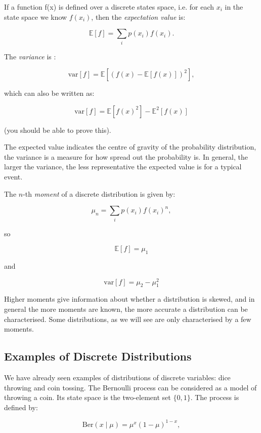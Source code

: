 If a function f(x) is defined over a discrete states space, i.e. for each $x_i$ in the state space
we know $f(x_i)$, then the \emph{expectation value} is:

\begin{equation}
\mathbb{E}[f] = \sum_i p(x_i)f(x_i).
\end{equation}

The \emph{variance} is :

\begin{equation}
\mbox{var}[f] = \mathbb{E}[(f(x) - \mathbb{E}[f(x)])^2],
\end{equation}

which can also be written as:

$$
\mbox{var}[f] = \mathbb{E}[f(x)^2] - \mathbb{E}^2[f(x)]
$$

(you should be able to prove this).

The expected value indicates the centre of gravity of the probability distribution, the variance is
a measure for how spread out the probability is. In general, the larger the variance, the less representative
the expected value is for a typical event.

The $n$-th \emph{moment} of a discrete distribution is given by:

$$
\mu_n = \sum_i p(x_i) f(x_i)^n,
$$

so

$$
\mathbb{E}[f] = \mu_1
$$

and

$$
\mbox{var}[f] = \mu_2 - \mu^2_1
$$

Higher moments give information about whether a distribution is skewed, and in general
the more moments are known, the more accurate a distribution can be characterised. Some distributions,
as we will see are only characterised by a few moments.

\subsection{Examples of Discrete Distributions}

We have already seen examples of distributions of discrete variables: dice throwing and coin tossing. The Bernoulli process can be considered as a model
of throwing a coin. Its state space is the two-element set $\{0, 1 \}$. The process is defined by:

\begin{equation}
\mbox{Ber}(x \mid \mu) = \mu^x(1-\mu)^{1-x},
\end{equation}

